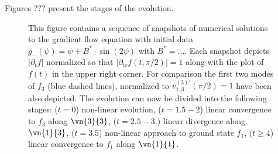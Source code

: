 Figures ??? present the stages of the evolution.


\begin{figure}[h]
  \label{fig:snapshot2}
  \centering
  \advance\leftskip-3cm
  
  \caption{This figure contains a sequence of snapshots of numerical
    solutions to the gradient flow equation with initial data
    $g_-(\psi)=\psi+B^*\cdot \sin(2\psi)$ with $B^*=...$. Each
    snapshot depicts $\lvert \partial_t f\rvert$ normalized so that
    $\lvert \partial_{tr} f(t,\pi/2)\rvert=1$ along with the plot of
    $f(t)$ in the upper right corner. For comparison the first two
    modes of $f_3$ (blue dashed lines), normalized to
    $v_{1,3}^{(3)\prime}(\pi/2)=1$ have been also depicted. The
    evolution can now be divided into the following stages: ($t=0$)
    non-linear evolution, ($t=1.5-2$) linear convergence to $f_3$
    along $\vn{3}{3}$, ($t=2.5-3.$) linear divergence along
    $\vn{1}{3}$, ($t=3.5$) non-linear approach to ground state $f_1$,
    ($t\ge4$) linear convergence to $f_1$ along $\vn{1}{1}$.}
\end{figure}

